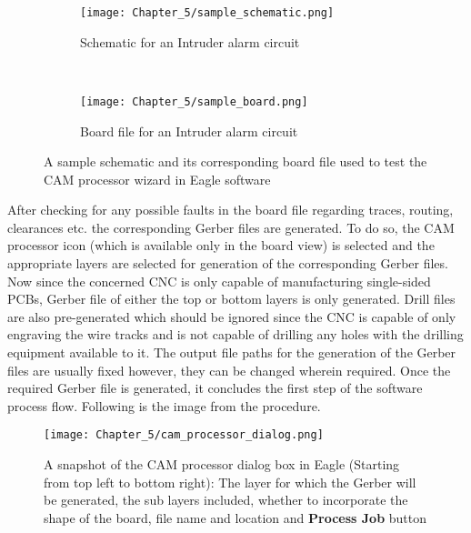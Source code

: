\begin{figure}[h]
\begin{center}
\hspace{-45mm}
 \begin{subfigure}{0.5\textwidth}
  \texttt{[image: Chapter\_5/sample\_schematic.png]}
  \caption{Schematic for an Intruder alarm circuit} 
  \label{fig:ckt_sch}
 \end{subfigure} \\
 \end{center}
 \begin{center}
 \begin{subfigure}{0.5\textwidth}
  \texttt{[image: Chapter\_5/sample\_board.png]}
  \caption{Board file for an Intruder alarm circuit}
  \label{fig:ckt_brd}
 \end{subfigure} 
\end{center}

 \caption{A sample schematic and its corresponding board file used to test the CAM processor wizard in Eagle software}
 \label{fig:sample_ckt}
\end{figure}


After checking for any possible faults in the board file regarding traces, routing, clearances etc. the corresponding Gerber files are generated. To do so, the CAM processor icon (which is available only in the board view) is selected and the appropriate layers are selected for generation of the corresponding Gerber files. Now since the concerned CNC is only capable of manufacturing single-sided PCBs, Gerber file of either the top or bottom layers is only generated. Drill files are also pre-generated which should be ignored since the CNC is capable of only engraving the wire tracks and is not capable of drilling any holes with the drilling equipment available to it. The output file paths for the generation of the Gerber files are usually fixed however, they can be changed wherein required. Once the required Gerber file is generated, it concludes the first step of the software process flow. Following is the image from the procedure. \pagebreak

\begin{figure}[h]
    \centering
    \texttt{[image: Chapter\_5/cam\_processor\_dialog.png]}
    \caption{A snapshot of the CAM processor dialog box in Eagle (Starting from top left to bottom right): The layer for which the Gerber will be generated, the sub layers included, whether to incorporate the shape of the board, file name and location and \textbf{Process Job} button}
    \label{fig:cam_dialog}
\end{figure}


